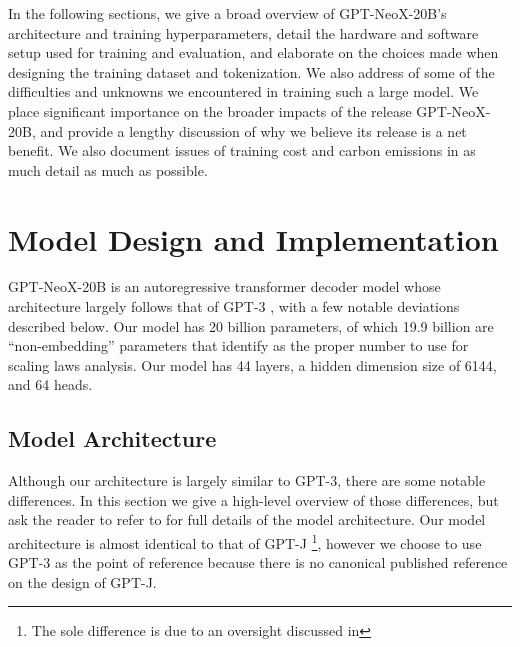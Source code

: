 \documentclass[11pt]{article}
\newcommand{\model}{GPT-NeoX-20B}
\begin{document}
In the following sections, we give a broad overview of \model{}'s architecture and training hyperparameters, detail the hardware and software setup used for training and evaluation, and elaborate on the choices made when designing the training dataset and tokenization. We also address of some of the difficulties and unknowns we encountered in training such a large model. We place significant importance on the broader impacts of the release \model{}, and provide a lengthy discussion of why we believe its release is a net benefit. We also document issues of training cost and carbon emissions in as much detail as much as possible.

\section{Model Design and Implementation}
\label{sec:model-details}

\model{} is an autoregressive transformer decoder model whose architecture largely follows that of GPT-3 \citep{brown2020language}, with a few notable deviations described below. Our model has 20 billion parameters, of which 19.9 billion are ``non-embedding'' parameters that \citet{kaplan2020scaling} identify as the proper number to use for scaling laws analysis. Our model has 44 layers, a hidden dimension size of 6144, and 64 heads.

\subsection{Model Architecture}
\label{subsec:model-arch}

Although our architecture is largely similar to GPT-3, there are some notable differences. In this section we give a high-level overview of those differences, but ask the reader to refer to \cite{brown2020language} for full details of the model architecture. Our model architecture is almost identical to that of GPT-J \citep{gpt-j}\footnote{The sole difference is due to an oversight discussed in }, however we choose to use GPT-3 as the point of reference because there is no canonical published reference on the design of GPT-J.
\end{document}
